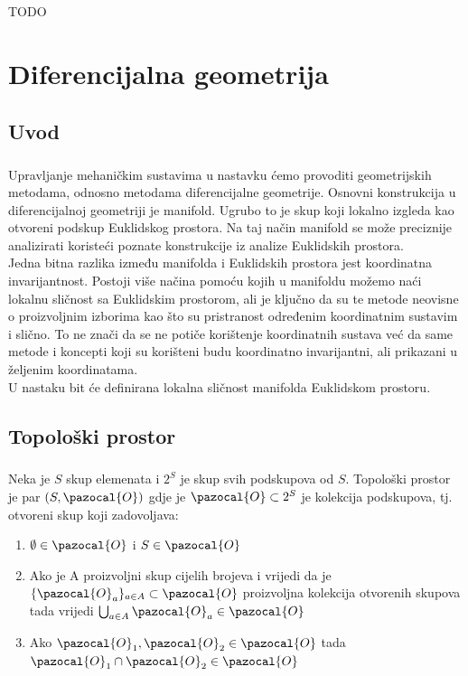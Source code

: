 \documentclass[times, utf8, diplomski]{fer}
\newcommand{\Oa}{\pazocal{O}}
\begin{document}
\paragraph{}
TODO

\newpage 
\clearpage

\chapter{Diferencijalna geometrija}

\section{Uvod}
	\paragraph{} Upravljanje mehaničkim sustavima u nastavku ćemo provoditi geometrijskih metodama, odnosno metodama diferencijalne geometrije. Osnovni konstrukcija u diferencijalnoj geometriji je manifold. Ugrubo to je skup koji lokalno izgleda kao otvoreni podskup Euklidskog prostora. Na taj način manifold se može preciznije analizirati koristeći poznate konstrukcije iz analize Euklidskih prostora. \\ 
	Jedna bitna razlika između manifolda i Euklidskih prostora jest koordinatna invarijantnost. Postoji više načina pomoću kojih u manifoldu možemo naći lokalnu sličnost sa Euklidskim prostorom, ali je ključno da su te metode neovisne o proizvoljnim izborima kao što su pristranost određenim koordinatnim sustavim i slično. To ne znači da se ne potiče korištenje koordinatnih sustava već da same metode i koncepti koji su korišteni budu koordinatno invarijantni, ali prikazani u željenim koordinatama. \\
	U nastaku bit će definirana lokalna sličnost manifolda Euklidskom prostoru.

\section{Topološki prostor}
	
	\paragraph{}Neka je $S$ skup elemenata i $2^S$ je skup svih podskupova od $S$. Topološki prostor je par $(S, \Oa)$ gdje je $\Oa\subset2^S$ je kolekcija podskupova, tj. otvoreni skup koji zadovoljava:
	\begin{enumerate}
		\item $\emptyset \in \Oa$ i $S \in \Oa$ 
		\item Ako je A proizvoljni skup cijelih brojeva i vrijedi da je $\{ \Oa_{a} \}_{a\in A}\subset \Oa$ proizvoljna kolekcija otvorenih skupova tada vrijedi $\bigcup_{a\in A}\Oa_a\in \Oa$
		\item Ako $\Oa_1, \Oa_2 \in \Oa$ tada $\Oa_1 \cap \Oa_2 \in \Oa$
	\end{enumerate}
\end{document}
